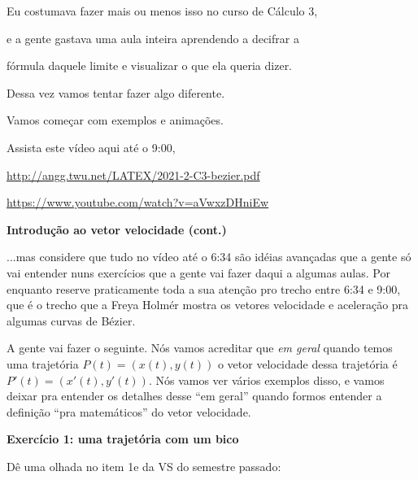 \documentclass[oneside,12pt]{article}
\begin{document}
\ssk

Eu costumava fazer mais ou menos isso no curso de Cálculo 3,

e a gente gastava uma aula inteira aprendendo a decifrar a

fórmula daquele limite e visualizar o que ela queria dizer.

\msk

Dessa vez vamos tentar fazer algo diferente.

Vamos começar com exemplos e animações.

Assista este vídeo aqui até o 9:00,

\ssk

{\footnotesize

\url{http://angg.twu.net/LATEX/2021-2-C3-bezier.pdf}

\url{https://www.youtube.com/watch?v=aVwxzDHniEw}

}

\ssk


\newpage

{\bf Introdução ao vetor velocidade (cont.)}

\ssk

...mas considere que tudo no vídeo até o 6:34 são idéias avançadas que
a gente só vai entender nuns exercícios que a gente vai fazer daqui a
algumas aulas. Por enquanto reserve praticamente toda a sua atenção
pro trecho entre 6:34 e 9:00, que é o trecho que a Freya Holmér mostra
os vetores velocidade e aceleração pra algumas curvas de Bézier.

A gente vai fazer o seguinte. Nós vamos acreditar que {\sl em geral}
quando temos uma trajetória $P(t) = (x(t),y(t))$ o vetor velocidade
dessa trajetória é $P'(t) = (x'(t),y'(t))$. Nós vamos ver vários
exemplos disso, e vamos deixar pra entender os detalhes desse ``em
geral'' quando formos entender a definição ``pra matemáticos'' do
vetor velocidade.

\newpage


{\bf Exercício 1: uma trajetória com um bico}

Dê uma olhada no item 1e da VS do semestre passado:
\end{document}

